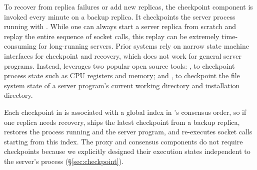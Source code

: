 To recover from replica failures or add new replicas, the checkpoint 
component is invoked every minute on a backup replica. It
checkpoints the server process running with \dmt.  While one can always start a 
server replica from scratch and replay the entire sequence of socket calls, 
this replay can be extremely time-consuming for long-running servers.  Prior 
\smr systems rely on narrow state machine interfaces for checkpoint and
recovery, which does not work for general server programs. Instead, \xxx
leverages two popular open source tools: \criu, to checkpoint process 
state such as CPU registers and memory; and \lxc, to checkpoint the file 
system state of a server program's current working directory and installation 
directory.

Each checkpoint in \xxx is associated with a global index in \paxos's consensus 
order, so if one replica needs recovery, \xxx ships the latest checkpoint from a 
backup replica, restores the process running \dmt and the server program, and 
re-executes socket calls starting from this index. The proxy and consensus 
components do not require checkpoints because we explicitly designed their 
execution states independent to the server's process (\S\ref{sec:checkpoint}).


